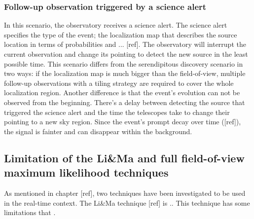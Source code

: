 \subsubsection{Follow-up observation triggered by a science alert}
In this scenario, the observatory receives a science alert. The science alert specifies the type of the event; the localization map that describes the source location in terms of probabilities and ... [ref]. The observatory will interrupt the current observation and change its pointing to detect the new source in the least possible time. This scenario differs from the serendipitous discovery scenario in two ways: if the localization map is much bigger than the field-of-view, multiple follow-up observations with a tiling strategy \cite{bulgarelli2015science} are required to cover the whole localization region. Another difference is that the event's evolution can not be observed from the beginning. There's a delay between detecting the source that triggered the science alert and the time the telescopes take to change their pointing to a new sky region. Since the event's prompt decay over time ([ref]), the signal is fainter and can disappear within the background.

\subsection{Limitation of the Li\&Ma and full field-of-view maximum likelihood techniques}
\label{s:Contribution-2-Major-1-Minor-1}
As mentioned in chapter [ref], two techniques have been investigated to be used in the real-time context. The Li\&Ma technique [ref] is ..
This technique has some limitations that . 

